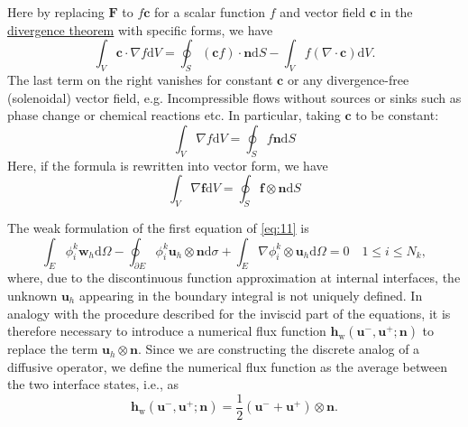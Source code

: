 \documentclass{develop-note}
\begin{document}
Here by replacing $\mathbf{F}$ to $f\mathbf{c}$ for a scalar function $f$ and vector field $\mathbf{c}$ in the \href{https://en.wikipedia.org/wiki/Divergence_theorem}{divergence theorem} with specific forms, we have
\begin{equation}
  \int_{V}\mathbf{c}\cdot\nabla f\mathrm{d}V=\oint_{S}(\mathbf{c}f)\cdot\mathbf{n}\mathrm{d}S-\int_{V}f(\nabla\cdot\mathbf{c})\mathrm{d}V.
\end{equation}
The last term on the right vanishes for constant $\mathbf{c}$ or any divergence-free (solenoidal) vector field, e.g. Incompressible flows without sources or sinks such as phase change or chemical reactions etc. In particular, taking
$\mathbf{c}$ to be constant:
\begin{equation}
  \int_{V}\nabla f\mathrm{d}V=\oint_{S}f\mathbf{n}\mathrm{d}S
\end{equation}
Here, if the formula is rewritten into vector form, we have
\begin{equation}
  \int_{V}\nabla\mathbf{f}\mathrm{d}V=\oint_{S}\mathbf{f}\otimes\mathbf{n}\mathrm{d}S
\end{equation}

The weak formulation of the first equation of \autoref{eq:11} is
\begin{equation}
  \label{eq:15}
  \int_{E}\phi_{i}^{k}\mathbf{w}_{h}\mathrm{d}\Omega-\oint_{\partial E}\phi_{i}^{k}\mathbf{u}_{h}\otimes\mathbf{n}\mathrm{d}\sigma+\int_{E}\nabla\phi_{i}^{k}\otimes\mathbf{u}_{h}\mathrm{d}\Omega=0\quad 1\leqslant i\leqslant N_{k},
\end{equation}
where, due to the discontinuous function approximation at internal interfaces, the unknown $\mathbf{u}_{h}$ appearing in the boundary integral is not uniquely defined. In analogy with the procedure described for the inviscid part of the equations, it is therefore necessary to introduce a numerical flux function $\mathbf{h}_{\mathrm{w}}(\mathbf{u}^{-},\mathbf{u}^{+};\mathbf{n})$ to replace the term $\mathbf{u}_{h}\otimes\mathbf{n}$. Since we are constructing the discrete analog of a diffusive operator, we define the numerical flux function as the average between the two interface states, i.e., as
\begin{equation}
  \label{eq:16}
  \mathbf{h}_{\mathrm{w}}(\mathbf{u}^{-},\mathbf{u}^{+};\mathbf{n})=\dfrac{1}{2}(\mathbf{u}^{-}+\mathbf{u}^{+})\otimes\mathbf{n}.
\end{equation}
\end{document}
